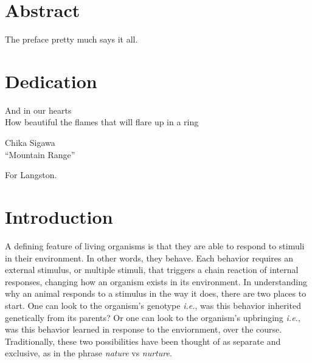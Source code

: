 \documentclass[12pt,twoside]{reedthesis}
\begin{document}
    \chapter*{Abstract}
	The preface pretty much says it all.
	
	\chapter*{Dedication}
  \epigraph{And in our hearts\\ How beautiful the flames that will flare up in a
    ring}{Chika Sigawa \\ ``Mountain Range''}
For Langston.
  \mainmatter %
  \pagestyle{fancyplain} %


    \chapter*{Introduction}

		
A defining feature of living organisms is that they are able to respond to
stimuli in their environment. In other words, they behave. Each behavior
requires an external stimulus, or multiple stimuli, that triggers a chain
reaction of internal responses, changing how an organism exists in its environment. In understanding why an animal responds to a stimulus in the way it does, there
are two places to start. One can look to the organism's genotype \textit{i.e.},
was this behavior inherited genetically from its parents? Or one can look to the
organism's upbringing \textit{i.e.}, was this behavior learned in response to
the enviornment, over the course. Traditionally, these two possibilities have been thought of as
separate and exclusive, as in the phrase \textit{nature} vs \textit{nurture}.  
\end{document}
